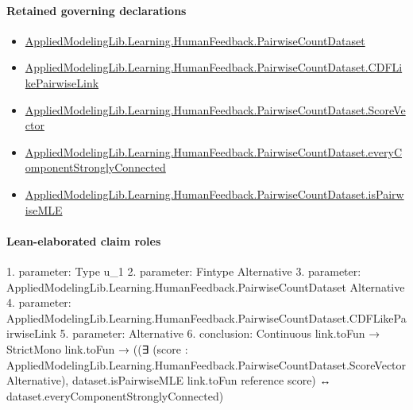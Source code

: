 \documentclass[10pt]{article}
\begin{document}
\paragraph{Retained governing declarations}
\begin{itemize}\raggedright
\item \hyperlink{governing-declaration-2ba23f394a8d08a2}{Applied\allowbreak{}Modeling\allowbreak{}Lib.\allowbreak{}Learning.\allowbreak{}Human\allowbreak{}Feedback.\allowbreak{}Pairwise\allowbreak{}Count\allowbreak{}Dataset}
\item \hyperlink{governing-declaration-3449f3559185d0fd}{Applied\allowbreak{}Modeling\allowbreak{}Lib.\allowbreak{}Learning.\allowbreak{}Human\allowbreak{}Feedback.\allowbreak{}Pairwise\allowbreak{}Count\allowbreak{}Dataset.\allowbreak{}CDF\allowbreak{}Like\allowbreak{}Pairwise\allowbreak{}Link}
\item \hyperlink{governing-declaration-87eda978eb1b0c9d}{Applied\allowbreak{}Modeling\allowbreak{}Lib.\allowbreak{}Learning.\allowbreak{}Human\allowbreak{}Feedback.\allowbreak{}Pairwise\allowbreak{}Count\allowbreak{}Dataset.\allowbreak{}Score\allowbreak{}Vector}
\item \hyperlink{governing-declaration-79dcfb666ba94992}{Applied\allowbreak{}Modeling\allowbreak{}Lib.\allowbreak{}Learning.\allowbreak{}Human\allowbreak{}Feedback.\allowbreak{}Pairwise\allowbreak{}Count\allowbreak{}Dataset.\allowbreak{}every\allowbreak{}Component\allowbreak{}Strongly\allowbreak{}Connected}
\item \hyperlink{governing-declaration-cba21d23e0e5aa10}{Applied\allowbreak{}Modeling\allowbreak{}Lib.\allowbreak{}Learning.\allowbreak{}Human\allowbreak{}Feedback.\allowbreak{}Pairwise\allowbreak{}Count\allowbreak{}Dataset.\allowbreak{}is\allowbreak{}Pairwise\allowbreak{}MLE}
\end{itemize}
\paragraph{Lean-elaborated claim roles}\begin{ReviewVerbatim}
1. parameter: Type u_1
2. parameter: Fintype Alternative
3. parameter: AppliedModelingLib.Learning.HumanFeedback.PairwiseCountDataset Alternative
4. parameter: AppliedModelingLib.Learning.HumanFeedback.PairwiseCountDataset.CDFLikePairwiseLink
5. parameter: Alternative
6. conclusion: Continuous link.toFun →
  StrictMono link.toFun →
    ((∃ (score : AppliedModelingLib.Learning.HumanFeedback.PairwiseCountDataset.ScoreVector Alternative),
        dataset.isPairwiseMLE link.toFun reference score) ↔
      dataset.everyComponentStronglyConnected)
\end{ReviewVerbatim}
\end{document}
